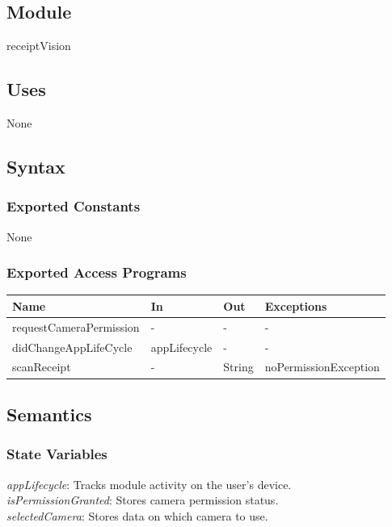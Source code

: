 \documentclass[12pt, titlepage]{article}
\begin{document}
\subsection{Module}

receiptVision

\subsection{Uses}

None

\subsection{Syntax}

\subsubsection{Exported Constants}

None

\subsubsection{Exported Access Programs}

\begin{center}
  \begin{tabular}{p{5cm} p{4cm} p{3cm} p{4cm}}
  \hline
  \textbf{Name} & \textbf{In} & \textbf{Out} & \textbf{Exceptions} \\
  \hline
  requestCameraPermission & - & - & - \\
  didChangeAppLifeCycle & appLifecycle & - & - \\
  scanReceipt & - & String & noPermissionException \\
  \hline
  \end{tabular}
\end{center}

\subsection{Semantics}

\subsubsection{State Variables}

\textit{appLifecycle}: Tracks module activity on the user's device. \\
\textit{isPermissionGranted}: Stores camera permission status. \\
\textit{selectedCamera}: Stores data on which camera to use.
\end{document}
